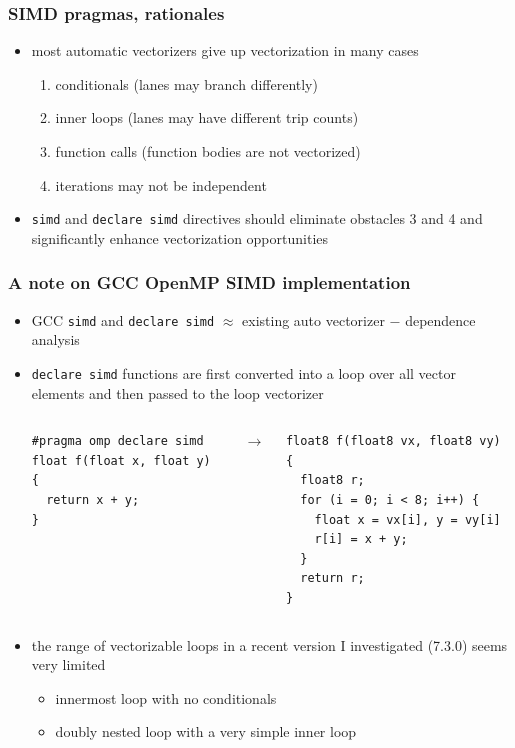 \documentclass[12pt,dvipdfmx]{beamer}
\begin{document}
\begin{frame}
\frametitle{SIMD pragmas, rationales}
\begin{itemize}
\item most automatic vectorizers give up vectorization in many cases
  \begin{enumerate}
  \item conditionals (lanes may branch differently)
  \item inner loops (lanes may have different trip counts)
  \item function calls (function bodies are not vectorized)
  \item iterations may not be independent
  \end{enumerate}

\item {\tt simd} and {\tt declare simd} directives
  should eliminate obstacles 3 and 4 and
  significantly enhance vectorization opportunities

\end{itemize}
\end{frame}

\begin{frame}[fragile]
\frametitle{A note on GCC OpenMP SIMD implementation}
\begin{itemize}
\item GCC {\tt simd} and {\tt declare simd}
  $\approx$ existing auto vectorizer $-$ dependence analysis

\item {\tt declare simd} functions are first converted into a loop
  over all vector elements and then passed to the loop vectorizer

\begin{columns}
\begin{column}{0.4\textwidth}
\begin{lstlisting}
#pragma omp declare simd
float f(float x, float y) {
  return x + y;
}
\end{lstlisting}
\end{column}
\begin{column}{0.05\textwidth}
$\rightarrow$
\end{column}
\begin{column}{0.45\textwidth}
\begin{lstlisting}
float8 f(float8 vx, float8 vy) {
  float8 r;
  for (i = 0; i < 8; i++) {
    float x = vx[i], y = vy[i]
    r[i] = x + y;
  }
  return r;
}
\end{lstlisting}
\end{column}
\end{columns}


\item the range of vectorizable loops in a
  recent version I investigated (7.3.0) seems very limited
  \begin{itemize}
  \item innermost loop with no conditionals
  \item doubly nested loop with a very simple inner loop
  \end{itemize}
\end{itemize}
\end{frame}
\end{document}
